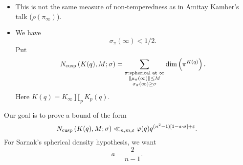 \documentclass[reqno]{amsart} 
\begin{document}
\begin{remark}
  \begin{itemize}
  \item This is not the same measure of non-temperedness as in Amitay Kamber's talk ($\rho (\pi _\infty )$).
  \item We have
    \begin{equation*}
      \sigma_\pi (\infty) < 1/2.
    \end{equation*}
    Put
    \begin{equation*}
      N_{\operatorname{cusp}} \left( K (q), M; \sigma  \right)
      = \sum_{
        \substack{
          \pi : \text{spherical at } \infty  \\
          \lVert \mu_\pi (\infty)  \rVert \leq M \\
          \sigma_\pi (\infty) \geq \sigma
        }
      }
      \dim \left( \pi^{K (q) } \right).
    \end{equation*}
    Here $K (q) = K _\infty \prod_p K_p (q)$.
  \end{itemize}
\end{remark}
Our goal is to prove a bound of the form
\begin{equation}\label{eq:cj4463r0qy}
  N_{\operatorname{cusp}} \left( K (q) , M; \sigma  \right) \ll_{n, m, \varepsilon }
  \varphi (q)
  q^{(n^2 - 1) [1 - a \cdot \sigma ] + \varepsilon }.
\end{equation}
For Sarnak's spherical density hypothesis, we want
\begin{equation*}
a = \frac{2}{ n - 1}.
\end{equation*}
\end{document}
